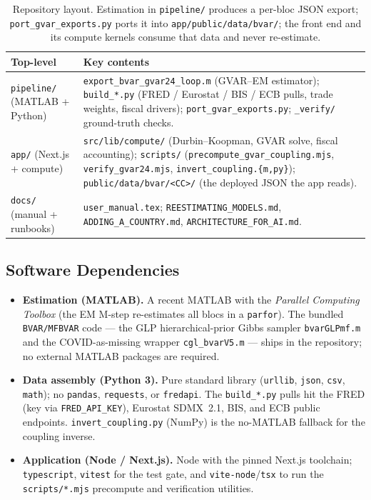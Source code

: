 \documentclass[11pt]{article}
\theoremstyle{definition}
\theoremstyle{remark}
\begin{document}
\begin{table}[H]
\centering
\footnotesize
\caption{Repository layout. Estimation in \texttt{pipeline/} produces a
per-bloc JSON export; \texttt{port\_gvar\_exports.py} ports it into
\texttt{app/public/data/bvar/}; the front end and its compute kernels consume
that data and never re-estimate.}
\label{tab:repro:layout}
\begin{tabular}{@{}lp{8.6cm}@{}}
\toprule
\textbf{Top-level} & \textbf{Key contents} \\
\midrule
\texttt{pipeline/} (MATLAB + Python) &
  \texttt{export\_bvar\_gvar24\_loop.m} (GVAR--EM estimator);
  \texttt{build\_*.py} (FRED / Eurostat / BIS / ECB pulls, trade weights,
  fiscal drivers); \texttt{port\_gvar\_exports.py}; \texttt{\_verify/}
  ground-truth checks. \\
\addlinespace
\texttt{app/} (Next.js + compute) &
  \texttt{src/lib/compute/} (Durbin--Koopman, GVAR solve, fiscal accounting);
  \texttt{scripts/} (\texttt{precompute\_gvar\_coupling.mjs},
  \texttt{verify\_gvar24.mjs}, \texttt{invert\_coupling.\{m,py\}});
  \texttt{public/data/bvar/<CC>/} (the deployed JSON the app reads). \\
\addlinespace
\texttt{docs/} (manual + runbooks) &
  \texttt{user\_manual.tex}; \texttt{REESTIMATING\_MODELS.md},
  \texttt{ADDING\_A\_COUNTRY.md}, \texttt{ARCHITECTURE\_FOR\_AI.md}. \\
\bottomrule
\end{tabular}
\end{table}

\subsection{Software Dependencies}\label{sec:repro:deps}

\begin{itemize}
  \item \textbf{Estimation (MATLAB).} A recent MATLAB with the
    \emph{Parallel Computing Toolbox} (the EM M-step re-estimates all blocs in
    a \texttt{parfor}). The bundled \texttt{BVAR/MFBVAR} code --- the GLP
    hierarchical-prior Gibbs sampler \texttt{bvarGLPmf.m} and the
    COVID-as-missing wrapper \texttt{cgl\_bvarV5.m} --- ships in the repository;
    no external MATLAB packages are required.
  \item \textbf{Data assembly (Python 3).} Pure standard library
    (\texttt{urllib}, \texttt{json}, \texttt{csv}, \texttt{math}); no
    \texttt{pandas}, \texttt{requests}, or \texttt{fredapi}. The
    \texttt{build\_*.py} pulls hit the FRED (key via \texttt{FRED\_API\_KEY}),
    Eurostat SDMX~2.1, BIS, and ECB public endpoints.
    \texttt{invert\_coupling.py} (NumPy) is the no-MATLAB fallback for the
    coupling inverse.
  \item \textbf{Application (Node / Next.js).} Node with the pinned Next.js
    toolchain; \texttt{typescript}, \texttt{vitest} for the test gate, and
    \texttt{vite-node}/\texttt{tsx} to run the \texttt{scripts/*.mjs}
    precompute and verification utilities.
\end{itemize}
\end{document}
